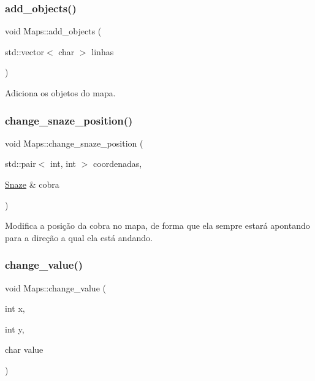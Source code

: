 \subsubsection{\texorpdfstring{add\+\_\+objects()}{add\_objects()}}
{\footnotesize\ttfamily void Maps\+::add\+\_\+objects (\begin{DoxyParamCaption}\item[{std\+::vector$<$ char $>$}]{linhas }\end{DoxyParamCaption})\hspace{0.3cm}{\ttfamily [inline]}}



Adiciona os objetos do mapa. 

\mbox{\label{classMaps_a441ea7041e0a6c21e546417d17a5c744}} 
\subsubsection{\texorpdfstring{change\+\_\+snaze\+\_\+position()}{change\_snaze\_position()}}
{\footnotesize\ttfamily void Maps\+::change\+\_\+snaze\+\_\+position (\begin{DoxyParamCaption}\item[{std\+::pair$<$ int, int $>$}]{coordenadas,  }\item[{\hyperlink{classSnaze}{Snaze} \&}]{cobra }\end{DoxyParamCaption})\hspace{0.3cm}{\ttfamily [inline]}}



Modifica a posição da cobra no mapa, de forma que ela sempre estará apontando para a direção a qual ela está andando. 

\mbox{\label{classMaps_a511070b444b7e3ab8afc5b22d77d3290}} 
\subsubsection{\texorpdfstring{change\+\_\+value()}{change\_value()}}
{\footnotesize\ttfamily void Maps\+::change\+\_\+value (\begin{DoxyParamCaption}\item[{int}]{x,  }\item[{int}]{y,  }\item[{char}]{value }\end{DoxyParamCaption})\hspace{0.3cm}{\ttfamily [inline]}}



